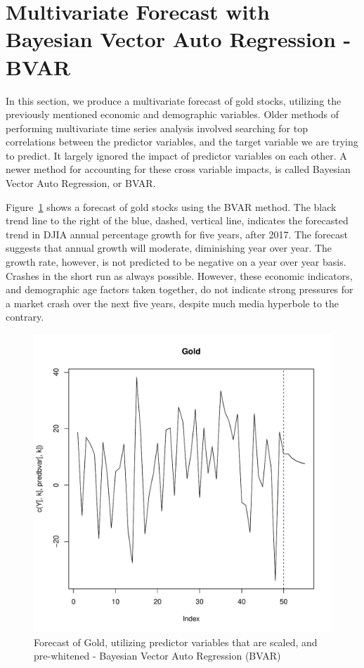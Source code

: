 \documentclass[12pt]{article}         %
\begin{document}
\section{Multivariate Forecast with Bayesian Vector Auto Regression - BVAR}

In this section, we produce a multivariate forecast of gold stocks, utilizing the previously mentioned economic and demographic variables.  Older methods of performing multivariate time series analysis involved searching for top correlations between the predictor variables, and the target variable we are trying to predict.  It largely ignored the impact of predictor variables on each other.  A newer method for accounting for these cross variable impacts, is called Bayesian Vector Auto Regression, or BVAR.

Figure~\ref{fig:BVARForecast} shows a forecast of gold stocks using the BVAR method.  The black trend line to the right of the blue, dashed, vertical line, indicates the forecasted trend in DJIA annual percentage growth for five years, after 2017.  The forecast suggests that annual growth will moderate, diminishing year over year.  The growth rate, however, is not predicted to be negative on a year over year basis.  Crashes in the short run as always possible.  However, these economic indicators, and demographic age factors taken together, do not indicate strong pressures for a market crash over the next five years, despite much media hyperbole to the contrary.

\begin{figure}[h!]
\begin{center}
\includegraphics[width=\linewidth]{plots/Gold_forecast.pdf}
\caption{Forecast of Gold, utilizing predictor variables that are scaled, and pre-whitened - Bayesian Vector Auto Regression (BVAR)}
\label{fig:BVARForecast}
\end{center}
\end{figure}
\end{document}
